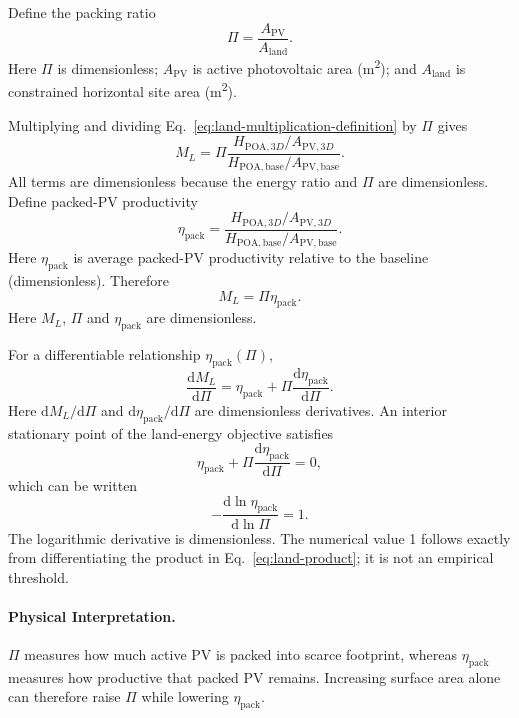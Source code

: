 \documentclass[11pt,a4paper]{article}
\begin{document}
Define the packing ratio
\begin{equation}
\Pi=\frac{A_{\mathrm{PV}}}{A_{\mathrm{land}}}.
\label{eq:packing-land}
\end{equation}
Here \(\Pi\) is dimensionless; \(A_{\mathrm{PV}}\) is active photovoltaic area (\si{\square\metre}); and \(A_{\mathrm{land}}\) is constrained horizontal site area (\si{\square\metre}).

Multiplying and dividing Eq.~\eqref{eq:land-multiplication-definition} by \(\Pi\) gives
\begin{equation}
M_L=\Pi\frac{H_{\mathrm{POA},3D}/A_{\mathrm{PV},3D}}{H_{\mathrm{POA,base}}/A_{\mathrm{PV,base}}}.
\end{equation}
All terms are dimensionless because the energy ratio and \(\Pi\) are dimensionless. Define packed-PV productivity
\begin{equation}
\eta_{\mathrm{pack}}=\frac{H_{\mathrm{POA},3D}/A_{\mathrm{PV},3D}}{H_{\mathrm{POA,base}}/A_{\mathrm{PV,base}}}.
\label{eq:packing-productivity}
\end{equation}
Here \(\eta_{\mathrm{pack}}\) is average packed-PV productivity relative to the baseline (dimensionless). Therefore
\begin{equation}
\boxed{M_L=\Pi\eta_{\mathrm{pack}}}.
\label{eq:land-product}
\end{equation}
Here \(M_L\), \(\Pi\) and \(\eta_{\mathrm{pack}}\) are dimensionless.

For a differentiable relationship \(\eta_{\mathrm{pack}}(\Pi)\),
\begin{equation}
\frac{\mathrm dM_L}{\mathrm d\Pi}
=
\eta_{\mathrm{pack}}
+
\Pi\frac{\mathrm d\eta_{\mathrm{pack}}}{\mathrm d\Pi}.
\end{equation}
Here \(\mathrm dM_L/\mathrm d\Pi\) and \(\mathrm d\eta_{\mathrm{pack}}/\mathrm d\Pi\) are dimensionless derivatives. An interior stationary point of the land-energy objective satisfies
\begin{equation}
\eta_{\mathrm{pack}}
+
\Pi\frac{\mathrm d\eta_{\mathrm{pack}}}{\mathrm d\Pi}
=0,
\end{equation}
which can be written
\begin{equation}
\boxed{
-\frac{\mathrm d\ln\eta_{\mathrm{pack}}}{\mathrm d\ln\Pi}=1
}.
\end{equation}
The logarithmic derivative is dimensionless. The numerical value 1 follows exactly from differentiating the product in Eq.~\eqref{eq:land-product}; it is not an empirical threshold.

\paragraph{Physical Interpretation.}
\(\Pi\) measures how much active PV is packed into scarce footprint, whereas \(\eta_{\mathrm{pack}}\) measures how productive that packed PV remains. Increasing surface area alone can therefore raise \(\Pi\) while lowering \(\eta_{\mathrm{pack}}\).
\end{document}
